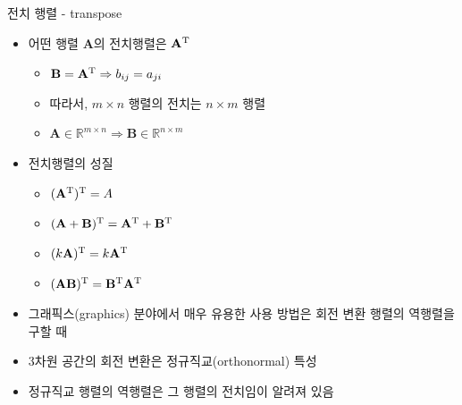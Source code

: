 \documentclass{beamer}
\begin{document}
\begin{frame}{전치 행렬 - transpose}

\begin{itemize}
\item 어떤 행렬 $\mathbf A$의 전치행렬은 $\mathbf A^{\rm T}$
	\begin{itemize}
	\item $\mathbf B = \mathbf A^{\rm T} \Rightarrow b_{ij} = a_{ji}$
	\item 따라서, $m \times n$ 행렬의 전치는 $n \times m$ 행렬
	\item $\mathbf A \in \mathbb R^{m \times n} \Rightarrow \mathbf B \in \mathbb R^{n \times m}$
	\end{itemize}
\item 전치행렬의 성질
	\begin{itemize}
	\item $\mathbf (\mathbf A^{\rm T})^{\rm T} = A$
	\item $(\mathbf A + \mathbf B)^{\rm T} = \mathbf A^{\rm T} + \mathbf B^{\rm T}$
	\item $(k\mathbf A)^{\rm T} = k \mathbf A^{\rm T}$
	\item $(\mathbf {AB})^{\rm T} = \mathbf B^{\rm T} \mathbf A^{\rm T}$
	\end{itemize}
\item 그래픽스(graphics) 분야에서 매우 유용한 사용 방법은 회전 변환 행렬의 역행렬을 구할 때
\item 3차원 공간의 회전 변환은 정규직교(orthonormal) 특성
\item 정규직교 행렬의 역행렬은 그 행렬의 전치임이 알려져 있음
\end{itemize}

\end{frame}
\end{document}
